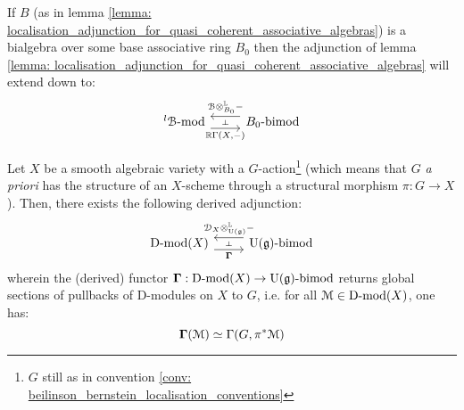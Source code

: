                 \begin{corollary} \label{coro: localisation_adjunction_for_quasi_coherent_associative_algebras}
                    If $B$ (as in lemma \ref{lemma: localisation_adjunction_for_quasi_coherent_associative_algebras}) is a bialgebra over some  base associative ring $B_0$ then the adjunction of lemma \ref{lemma: localisation_adjunction_for_quasi_coherent_associative_algebras} will extend down to:
                        $$
                            \begin{tikzcd}
                            	{{}^l\calB\mod} & {B_0\bimod}
                            	\arrow[""{name=0, anchor=center, inner sep=0}, "{\R\Gamma(X, -)}"', shift right=2, from=1-1, to=1-2]
                            	\arrow[""{name=1, anchor=center, inner sep=0}, "{\calB \tensor_{B_0}^{\L} -}"', shift right=2, from=1-2, to=1-1]
                            	\arrow["\dashv"{anchor=center, rotate=-90}, draw=none, from=1, to=0]
                            \end{tikzcd}
                        $$
                \end{corollary}
                \begin{theorem} \label{theorem: localisation_adjunction_for_D_modules}
                    Let $X$ be a smooth algebraic variety with a $G$-action\footnote{$G$ still as in convention \ref{conv: beilinson_bernstein_localisation_conventions}} (which means that $G$ \textit{a priori} has the structure of an $X$-scheme through a structural morphism $\pi: G \to X$). Then, there exists the following derived adjunction:
                        $$
                            \begin{tikzcd}
                            	{\Dmod(X)} & {\U(\g)\bimod}
                            	\arrow[""{name=0, anchor=center, inner sep=0}, "{\bfGamma}"', shift right=2, from=1-1, to=1-2]
                            	\arrow[""{name=1, anchor=center, inner sep=0}, "{\D_X \tensor^{\L}_{\U(\g)} -}"', shift right=2, from=1-2, to=1-1]
                            	\arrow["\dashv"{anchor=center, rotate=-90}, draw=none, from=1, to=0]
                            \end{tikzcd}
                        $$
                    wherein the (derived) functor $\mathbf{\Gamma}: \mathrm{D}\text{-}\mathrm{mod}(X) \to \mathrm{U}(\mathfrak{g})\text{-}\mathrm{bimod}$ returns global sections of pullbacks of D-modules on $X$ to $G$, i.e. for all $\mathcal{M} \in \mathrm{D}\text{-}\mathrm{mod}(X)$, one has:
                        $$\mathbf{\Gamma}(\mathcal{M}) \simeq \Gamma(G, \pi^*\mathcal{M})$$
                \end{theorem}
